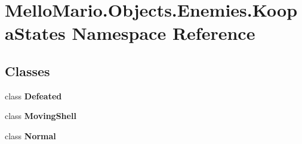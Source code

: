 \section{Mello\+Mario.\+Objects.\+Enemies.\+Koopa\+States Namespace Reference}
\label{namespaceMelloMario_1_1Objects_1_1Enemies_1_1KoopaStates}
\subsection*{Classes}
\begin{DoxyCompactItemize}
\item 
class \textbf{ Defeated}
\item 
class \textbf{ Moving\+Shell}
\item 
class \textbf{ Normal}
\end{DoxyCompactItemize}
